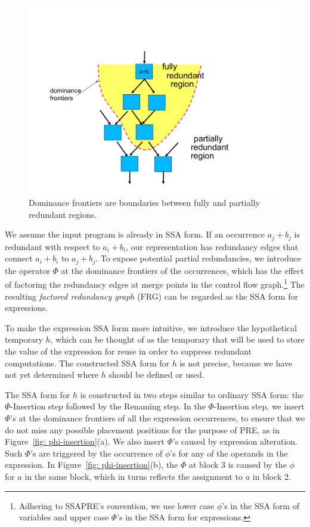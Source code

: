 \begin{figure}
\centering
\includegraphics[scale=0.35]{fig-ssapre-motive.pdf}
\caption{Dominance frontiers are boundaries between fully and partially redundant regions.}
\label{fig: ssapre-motive}
\end{figure}

We assume the input program is already in SSA form.  If an occurrence
$a_j+b_j$ is redundant with respect to $a_i+b_i$, our representation has 
redundancy edges that connect $a_i+b_i$ to
$a_j+b_j$.  To expose potential partial redundancies, we introduce the 
operator $\Phi$ at the dominance frontiers of the occurrences, which has the 
effect of factoring the redundancy edges at merge points in the control
flow graph.\footnote{Adhering to SSAPRE's convention, we use lower case 
$\phi$'s in the SSA form of variables and upper case $\Phi$'s
in the SSA form for expressions.} The resulting \emph{factored redundancy 
graph} (FRG) can be regarded as the SSA form for expressions.

To make the expression SSA form more intuitive, we introduce the 
hypothetical temporary $h$,
which can be thought of as the temporary that will be used to store the value
of the expression for reuse in order to suppress redundant computations.
The constructed SSA form for $h$ is not precise, because we have not yet 
determined where $h$ should be defined or used.

The SSA form for $h$ is constructed in two steps similar to ordinary SSA
form: the $\Phi$-Insertion step followed by the Renaming step.  
In the $\Phi$-Insertion 
step, we insert $\Phi$'s at the dominance frontiers of all the expression 
occurrences, to ensure that we do not miss any possible placement positions
for the purpose of PRE, as in Figure~\ref{fig: phi-insertion}(a).
We also insert $\Phi$'s caused by expression alteration.
Such $\Phi$'s are triggered by the occurrence of $\phi$'s
for any of the operands in the expression.
In Figure~\ref{fig: phi-insertion}(b), the $\Phi$ at block 3 is caused by
the $\phi$ for $a$ in the same block, which in turns reflects the
assignment to $a$ in block 2.

